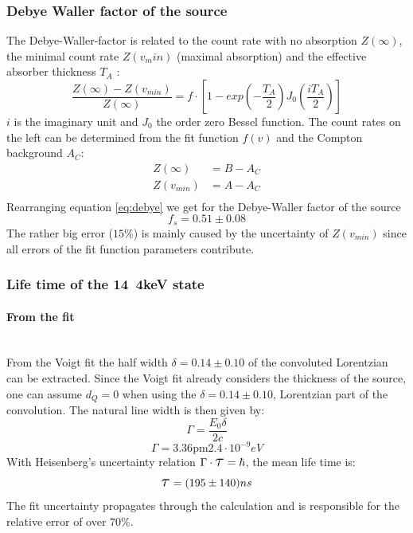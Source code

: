 \subsubsection{Debye Waller factor of the source}
The Debye-Waller-factor is related to the count rate with no absorption $Z(\infty)$, the minimal count rate $Z(v_min)$ (maximal absorption) and the effective absorber thickness $T_A$ \cite{Wegener}:
\begin{equation}
\frac{Z(\infty)-Z(v_{min})}{Z(\infty)}=f\cdot [1-exp(-\frac{T_A}{2})J_0(\frac{iT_A}{2})]
\label{eq:debye}
\end{equation}
$i$ is the imaginary unit and $J_0$ the order zero Bessel function. The count rates on the left can be determined from the fit function $f(v)$ and the Compton background $A_C$:
\begin{equation}
\begin{aligned}
Z(\infty) &= B - A_C\\
Z(v_{min}) &= A-A_C\\
\end{aligned}
\end{equation}
Rearranging equation \ref{eq:debye} we get for the Debye-Waller factor of the source
\begin{equation}
f_s= 0.51\pm0.08
\end{equation}
The rather big error ($15\%$) is mainly caused by the uncertainty of $Z(v_{min})$ since all errors of the fit function parameters contribute.

\subsubsection{Life time of the \unit{14.4}{keV} state}
\paragraph{From the fit}\ \\
From the Voigt fit the half width $\delta = 0.14 \pm 0.10$ of the convoluted Lorentzian can be extracted. Since the Voigt fit already considers the thickness of the source, one can assume $d_Q=0$ when using the  $\delta = 0.14 \pm 0.10$, Lorentzian part of the convolution. The natural line width is then given by:
\begin{equation}
\Gamma  = \frac{E_0 \delta}{2c}
\end{equation}
\begin{equation}
\Gamma  = \unit{3.36\pm2.4\cdot 10^{-9}}{eV}
\end{equation}
With Heisenberg's uncertainty relation $\Gamma \cdot \scalebox{1.5}{$\tau$}=\hbar$, the mean life time is:
\begin{equation}
\scalebox{1.5}{$\tau$}= (195\pm140)ns
\end{equation}
The fit uncertainty propagates through the calculation and is responsible for the relative error of over $70\%$. 

